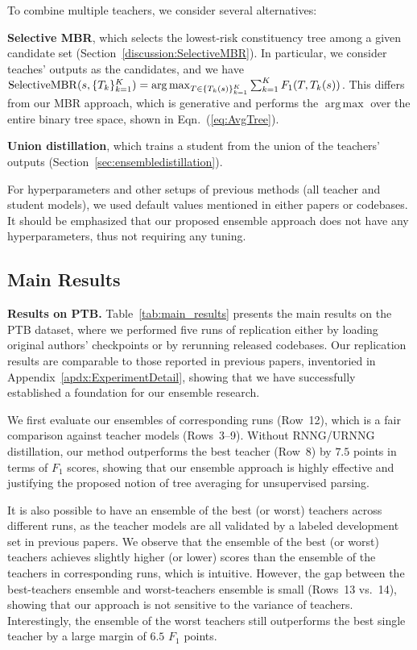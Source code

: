 \documentclass{article}
\DeclareMathOperator*{\argmax}{arg\,max}
\begin{document}
To combine multiple teachers, we consider several alternatives:
\begin{compactitem}[\quad$\bullet$]
\item \textbf{Selective MBR}, which selects the lowest-risk constituency tree among a given candidate set (Section~\ref{discussion:SelectiveMBR}). In particular, we consider teaches' outputs as the candidates, and we have     $\operatorname{SelectiveMBR}(s, \{T_k\}_{k=1}^K) = \argmax_{T \in \mathcal  \{T_k(s)\}_{k=1}^K} \sum_{k=1}^K F_1(T, T_k(s))$. This differs from our MBR approach, which is generative and performs the $\argmax$ over the entire binary tree space, shown in Eqn.~(\ref{eq:AvgTree}).

\item \textbf{Union distillation}, which trains a student from the union of the teachers' outputs (Section~\ref{sec:ensembledistillation}).
\end{compactitem}

For hyperparameters and other setups of previous methods (all teacher and student models), we used default values mentioned in either papers or codebases. It should be emphasized that our proposed ensemble approach does not have any hyperparameters, thus not requiring any tuning.


\subsection{Main Results}


\textbf{Results on PTB.} Table~\ref{tab:main_results} presents the main results on the PTB dataset, where we performed five runs of replication either by loading original authors' checkpoints or by rerunning released codebases. Our replication results are comparable to those reported in previous papers, inventoried in Appendix~\ref{apdx:ExperimentDetail}, showing that we have successfully established a foundation for our ensemble research.

We first evaluate our ensembles of corresponding runs (Row~12), which is a fair comparison against teacher models (Rows~3--9). Without RNNG/URNNG distillation, our method outperforms the best teacher (Row~8) by $7.5$ points in terms of $F_1$ scores, showing that our ensemble approach is highly effective and justifying the proposed notion of tree averaging for unsupervised parsing. 

It is also possible to have an ensemble of the best (or worst) teachers across different runs, as the teacher models are all validated by a labeled development set in previous papers. We observe that the ensemble of the best (or worst) teachers achieves slightly higher (or lower) scores than the ensemble of the teachers in corresponding runs, which is intuitive. However, the gap between the best-teachers ensemble and worst-teachers ensemble is small (Rows~13 vs.~14), showing that our approach is not sensitive to the variance of teachers. Interestingly, the ensemble of the worst teachers still outperforms the best single teacher by a large margin of $6.5$ $F_1$ points. 
\end{document}
